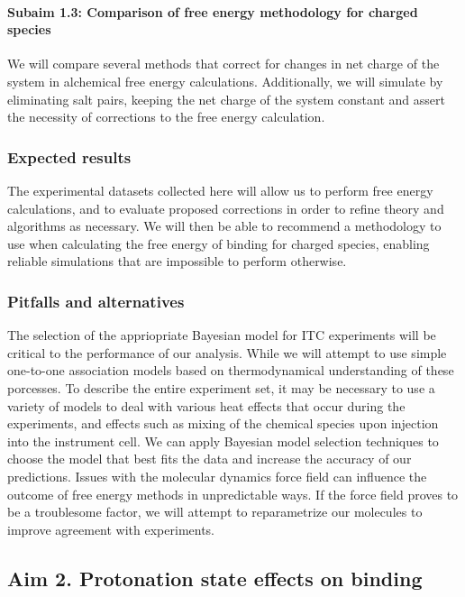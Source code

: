 \documentclass[10pt]{article}
\newcommand{\subsubsubsection}[1]{\paragraph*{#1}}
\begin{document}
\subsubsubsection{Subaim 1.3: Comparison of free energy methodology for charged species}
We will compare several methods that correct for changes in net charge of the system in alchemical free energy calculations\cite{Reif2013a,Rocklin2013a}. Additionally, we will simulate by eliminating salt pairs, keeping the net charge of the system constant and assert the necessity of corrections to the free energy calculation.
 
\subsubsection*{Expected results}
The experimental datasets collected here will allow us to perform free energy calculations, and to evaluate proposed corrections in order to refine theory and algorithms as necessary. We will then be able to recommend a methodology to use when calculating the free energy of binding for charged species, enabling reliable simulations that are impossible to perform otherwise.
\subsubsection*{Pitfalls and alternatives}
The selection of the appriopriate Bayesian model for ITC experiments will be critical to the performance of our analysis. While we will attempt to use simple one-to-one association models based on thermodynamical understanding of these porcesses. To describe the entire experiment set, it may be necessary to use a variety of models to deal with various heat effects that occur during the experiments, and effects such as mixing of the chemical species upon injection into the instrument cell. We can apply Bayesian model selection techniques to choose the model that best fits the data and increase the accuracy of our predictions.
Issues with the molecular dynamics force field can influence the outcome of free energy methods in unpredictable ways. If the force field proves to be a troublesome factor, we will attempt to reparametrize our molecules to improve agreement with experiments.

\subsection*{Aim 2. Protonation state effects on binding}
\end{document}
